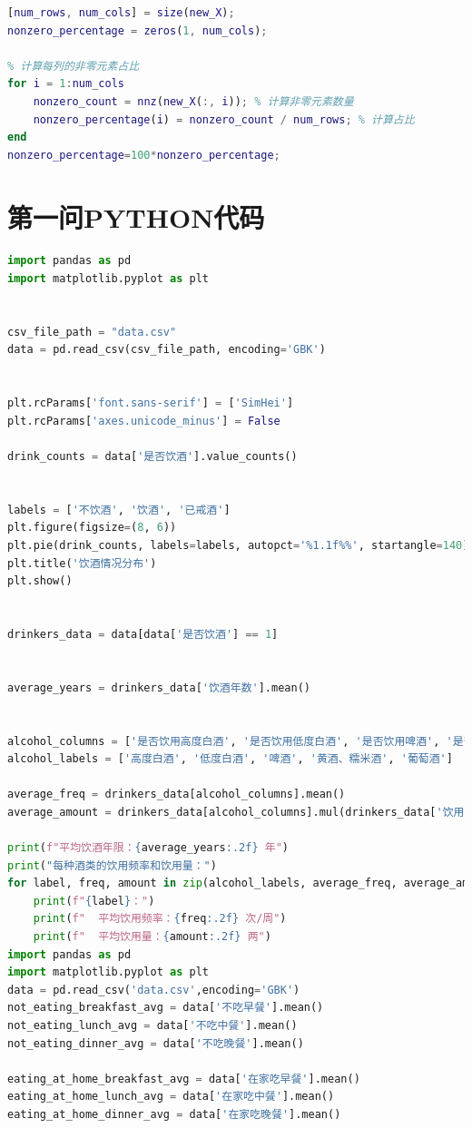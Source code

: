 \documentclass[withoutpreface,bwprint]{cumcmthesis} %
\begin{document}
\begin{appendices}
\begin{lstlisting}[language=matlab]
% 各食物食用人数占比,结果储存在nonzero_percentage
[num_rows, num_cols] = size(new_X);
nonzero_percentage = zeros(1, num_cols);

% 计算每列的非零元素占比
for i = 1:num_cols
    nonzero_count = nnz(new_X(:, i)); % 计算非零元素数量
    nonzero_percentage(i) = nonzero_count / num_rows; % 计算占比
end
nonzero_percentage=100*nonzero_percentage;
\end{lstlisting}
\section{第一问PYTHON代码}
\begin{lstlisting}[language=python]
import pandas as pd
import matplotlib.pyplot as plt


csv_file_path = "data.csv"  
data = pd.read_csv(csv_file_path, encoding='GBK')


plt.rcParams['font.sans-serif'] = ['SimHei']
plt.rcParams['axes.unicode_minus'] = False 

drink_counts = data['是否饮酒'].value_counts()


labels = ['不饮酒', '饮酒', '已戒酒']
plt.figure(figsize=(8, 6))
plt.pie(drink_counts, labels=labels, autopct='%1.1f%%', startangle=140)
plt.title('饮酒情况分布')
plt.show()


drinkers_data = data[data['是否饮酒'] == 1]


average_years = drinkers_data['饮酒年数'].mean()


alcohol_columns = ['是否饮用高度白酒', '是否饮用低度白酒', '是否饮用啤酒', '是否饮用黄酒、糯米酒', '是否饮用葡萄酒']
alcohol_labels = ['高度白酒', '低度白酒', '啤酒', '黄酒、糯米酒', '葡萄酒']

average_freq = drinkers_data[alcohol_columns].mean()
average_amount = drinkers_data[alcohol_columns].mul(drinkers_data['饮用频率'], axis=0).sum() / drinkers_data['饮用频率'].sum()

print(f"平均饮酒年限：{average_years:.2f} 年")
print("每种酒类的饮用频率和饮用量：")
for label, freq, amount in zip(alcohol_labels, average_freq, average_amount):
    print(f"{label}：")
    print(f"  平均饮用频率：{freq:.2f} 次/周")
    print(f"  平均饮用量：{amount:.2f} 两")
import pandas as pd
import matplotlib.pyplot as plt
data = pd.read_csv('data.csv',encoding='GBK')
not_eating_breakfast_avg = data['不吃早餐'].mean()
not_eating_lunch_avg = data['不吃中餐'].mean()
not_eating_dinner_avg = data['不吃晚餐'].mean()

eating_at_home_breakfast_avg = data['在家吃早餐'].mean()
eating_at_home_lunch_avg = data['在家吃中餐'].mean()
eating_at_home_dinner_avg = data['在家吃晚餐'].mean()


\end{lstlisting}
\end{appendices}
\end{document}
